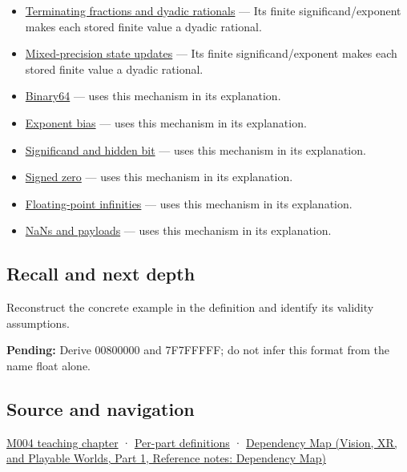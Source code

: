 \begin{itemize}
\item
  \hyperref[appendix-2a2f1b74bdd3]{Terminating fractions and dyadic rationals} --- Its finite significand/exponent makes each stored finite value a dyadic rational.
\item
  \hyperref[appendix-260182e617b7]{Mixed-precision state updates} --- Its finite significand/exponent makes each stored finite value a dyadic rational.
\item
  \hyperref[appendix-5078dfab64e6]{Binary64} --- uses this mechanism in its explanation.
\item
  \hyperref[appendix-2fae058c82e1]{Exponent bias} --- uses this mechanism in its explanation.
\item
  \hyperref[appendix-a24fd710cf67]{Significand and hidden bit} --- uses this mechanism in its explanation.
\item
  \hyperref[appendix-3a048f032c1f]{Signed zero} --- uses this mechanism in its explanation.
\item
  \hyperref[appendix-eb336149c00a]{Floating-point infinities} --- uses this mechanism in its explanation.
\item
  \hyperref[appendix-d6607cc4c235]{NaNs and payloads} --- uses this mechanism in its explanation.
\end{itemize}

\subsection{Recall and next depth}\label{appendix-5057f9ad327f-recall-and-next-depth}

\hypertarget{appendix-5057f9ad327f-recall-and-next-depth}{}

Reconstruct the concrete example in the definition and identify its validity assumptions.

\textbf{Pending:} Derive 00800000 and 7F7FFFFF; do not infer this format from the name float alone.

\subsection{Source and navigation}\label{appendix-5057f9ad327f-source-and-navigation}

\hypertarget{appendix-5057f9ad327f-source-and-navigation}{}

\hyperref[01-foundations-i-ch001-a-stretching-ruler-for-real-valued-quantities]{M004 teaching chapter} · \hyperref[appendix-fd090d982a15-m004---parts-61-76]{Per-part definitions} · \href{../07-Vision-XR-and-Playable-Worlds-P01/main.pdf\#nameddest=appendix-4ad47bdd269a}{Dependency Map (Vision, XR, and Playable Worlds, Part 1, Reference notes: Dependency Map)}
